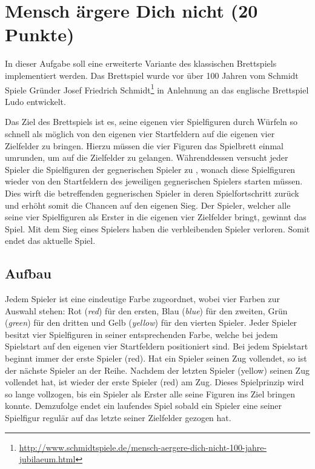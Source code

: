 \section*{Mensch ärgere Dich nicht (20 Punkte)}
In dieser Aufgabe soll eine erweiterte Variante des klassischen Brettspiels  implementiert werden. Das Brettspiel wurde vor über 100 Jahren vom Schmidt Spiele Gründer Josef Friedrich Schmidt\footnote{\url{http://www.schmidtspiele.de/mensch-aergere-dich-nicht-100-jahre-jubilaeum.html}} in Anlehnung an das englische Brettspiel Ludo entwickelt.

Das Ziel des Brettspiels ist es, seine eigenen vier Spielfiguren durch Würfeln so schnell als möglich von den eigenen vier Startfeldern auf die eigenen vier Zielfelder zu bringen. Hierzu müssen die vier Figuren das Spielbrett einmal umrunden, um auf die Zielfelder zu gelangen. Währenddessen versucht jeder Spieler die Spielfiguren der gegnerischen Spieler zu , wonach diese Spielfiguren wieder von den Startfeldern des jeweiligen gegnerischen Spielers starten müssen. Dies wirft die betreffenden gegnerischen Spieler in deren Spielfortschritt zurück und erhöht somit die Chancen auf den eigenen Sieg. Der Spieler, welcher alle seine vier Spielfiguren als Erster in die eigenen vier Zielfelder bringt, gewinnt das Spiel. Mit dem Sieg eines Spielers haben die verbleibenden Spieler verloren. Somit endet das aktuelle Spiel.

\subsection*{Aufbau}
Jedem Spieler ist eine eindeutige Farbe zugeordnet, wobei vier Farben zur Auswahl stehen: Rot (\emph{red}) für den ersten, Blau (\emph{blue}) für den zweiten, Grün (\emph{green}) für den dritten und Gelb (\emph{yellow}) für den vierten Spieler. Jeder Spieler besitzt vier Spielfiguren in seiner entsprechenden Farbe, welche bei jedem Spielstart auf den eigenen vier Startfeldern positioniert sind. Bei jedem Spielstart beginnt immer der erste Spieler (red). Hat ein Spieler seinen Zug vollendet, so ist der nächste Spieler an der Reihe. Nachdem der letzten Spieler (yellow) seinen Zug vollendet hat, ist wieder der erste Spieler (red) am Zug. Dieses Spielprinzip wird so lange vollzogen, bis ein Spieler als Erster alle seine Figuren ins Ziel bringen konnte. 
Demzufolge endet ein laufendes Spiel sobald ein Spieler eine seiner Spielfigur regulär auf das letzte seiner Zielfelder gezogen hat.

